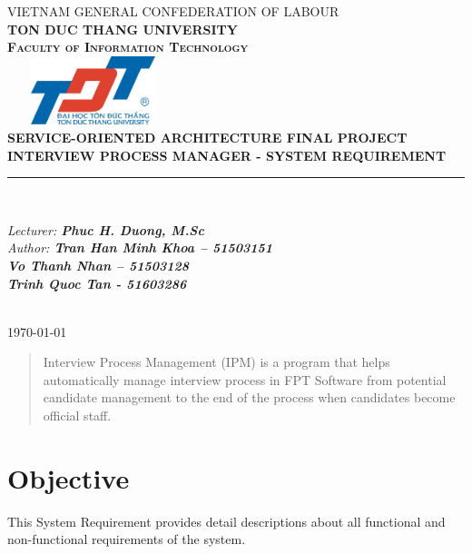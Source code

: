 \documentclass[a4paper]{article}
\begin{document}
\begin{titlepage}
	\newcommand{\HRule}{\rule{\linewidth}{0.5mm}}
	\centering
	\textsc{\large VIETNAM GENERAL CONFEDERATION OF LABOUR \\
		\large \bfseries TON DUC THANG UNIVERSITY \\
		\large \bfseries Faculty of Information Technology}\\[1.0cm]
	\includegraphics[width=5cm, height=2cm]{TDT} \\
	\vspace{5mm}
	\textsc{ \Large \bfseries SERVICE-ORIENTED ARCHITECTURE FINAL PROJECT}\\[1.5cm]
	{ \Large \bfseries INTERVIEW PROCESS MANAGER - SYSTEM REQUIREMENT}\\[1.0cm]
	\HRule \\[1.0cm]
	\vspace{20mm}
	\begin{minipage}{1.0\textwidth}
		\begin{flushright} \large
			\emph{Lecturer: \bfseries Phuc H. Duong, M.Sc} \\
			\emph{Author: \bfseries Tran Han Minh Khoa – 51503151
			} \\
			\emph{ \bfseries Vo Thanh Nhan – 51503128
			} \\
			\emph{ \bfseries Trinh Quoc Tan - 51603286} \\
		\end{flushright}
	\end{minipage}\\[2cm]
	
	{\large \today}\\[2cm]
\end{titlepage}



\begin{abstract}
Interview Process Management (IPM) is a program that helps automatically manage interview process in FPT Software from potential candidate management to the end of the process when candidates become official staff.
\end{abstract}

\section{Objective}
This System Requirement provides detail descriptions about all functional and non-functional requirements of the system. 
\end{document}

